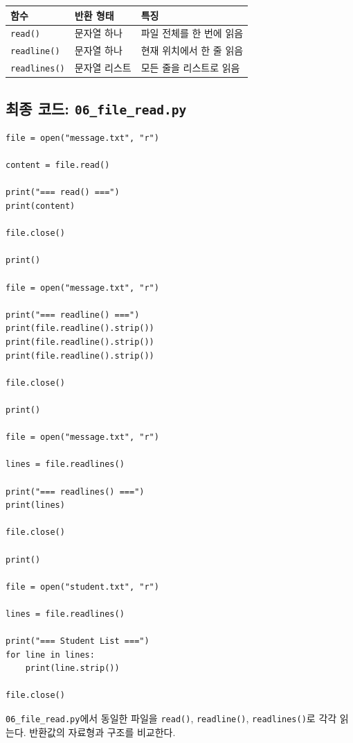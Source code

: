 \documentclass[11pt,a4paper]{article}
\begin{document}
\begin{center}
\begin{tabular}{lll}
\toprule
함수 & 반환 형태 & 특징 \\
\midrule
\texttt{read()} & 문자열 하나 & 파일 전체를 한 번에 읽음 \\
\texttt{readline()} & 문자열 하나 & 현재 위치에서 한 줄 읽음 \\
\texttt{readlines()} & 문자열 리스트 & 모든 줄을 리스트로 읽음 \\
\bottomrule
\end{tabular}
\end{center}

\subsection{최종 코드: \texttt{06\_file\_read.py}}

\begin{lstlisting}
file = open("message.txt", "r")

content = file.read()

print("=== read() ===")
print(content)

file.close()

print()

file = open("message.txt", "r")

print("=== readline() ===")
print(file.readline().strip())
print(file.readline().strip())
print(file.readline().strip())

file.close()

print()

file = open("message.txt", "r")

lines = file.readlines()

print("=== readlines() ===")
print(lines)

file.close()

print()

file = open("student.txt", "r")

lines = file.readlines()

print("=== Student List ===")
for line in lines:
    print(line.strip())

file.close()
\end{lstlisting}

\begin{practicebox}
\texttt{06\_file\_read.py}에서 동일한 파일을 \texttt{read()}, \texttt{readline()}, \texttt{readlines()}로 각각 읽는다. 반환값의 자료형과 구조를 비교한다.
\end{practicebox}
\end{document}

